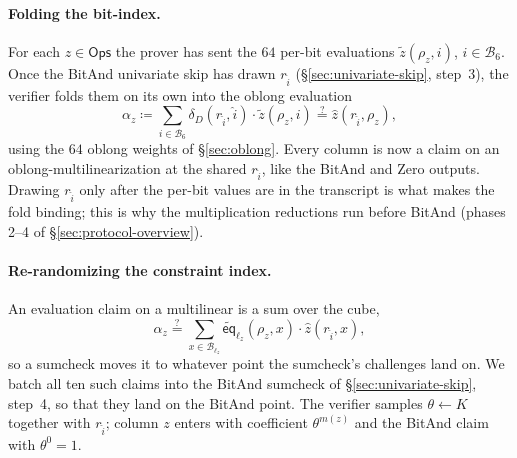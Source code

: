 \documentclass{article}
\theoremstyle{definition}
\newcommand*{\mle}{\widetilde}
\newcommand{\eq}{\mathsf{eq}}
\newcommand{\BB}{\mathcal{B}}
\begin{document}
\paragraph{Folding the bit-index.}
For each $z \in \textsf{Ops}$ the prover has sent the $64$ per-bit evaluations $\mle{z}(\rho_z, i)$, $i \in \BB_6$. Once the BitAnd univariate skip has drawn $r_{\widehat{i}}$ (\S\ref{sec:univariate-skip}, step~3), the verifier folds them on its own into the oblong evaluation
\[
  \alpha_z \coloneqq \sum_{i \in \BB_6} \delta_D(r_{\widehat{i}}, \widehat{i}) \cdot \mle{z}(\rho_z, i) \stackrel{?}{=} \widehat{z}(r_{\widehat{i}}, \rho_z),
\]
using the $64$ oblong weights of \S\ref{sec:oblong}. Every column is now a claim on an oblong-multilinearization at the shared $r_{\widehat{i}}$, like the BitAnd and Zero outputs. Drawing $r_{\widehat{i}}$ only after the per-bit values are in the transcript is what makes the fold binding; this is why the multiplication reductions run before BitAnd (phases 2--4 of \S\ref{sec:protocol-overview}).

\paragraph{Re-randomizing the constraint index.}
An evaluation claim on a multilinear is a sum over the cube,
\[
  \alpha_z \stackrel{?}{=} \sum_{x \in \BB_{\ell_z}} \mle{\eq}_{\ell_z}(\rho_z, x) \cdot \widehat{z}(r_{\widehat{i}}, x),
\]
so a sumcheck moves it to whatever point the sumcheck's challenges land on. We batch all ten such claims into the BitAnd sumcheck of \S\ref{sec:univariate-skip}, step~4, so that they land on the BitAnd point. The verifier samples $\theta \gets K$ together with $r_{\widehat{i}}$; column $z$ enters with coefficient $\theta^{m(z)}$ and the BitAnd claim with $\theta^0 = 1$.
\end{document}
